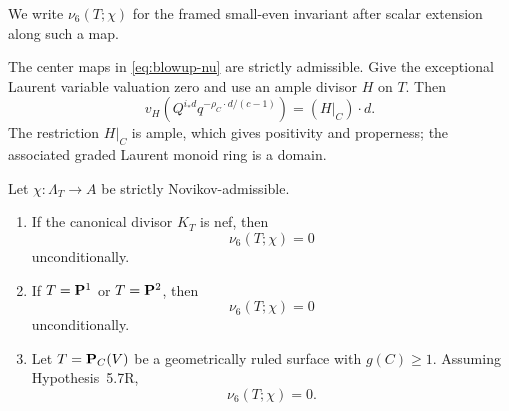 We write \(\nu_6(T;\chi)\) for the framed small-even invariant after scalar
extension along such a map.

The center maps in \eqref{eq:blowup-nu} are strictly admissible.  Give the exceptional
Laurent variable valuation zero and use an ample divisor \(H\) on \(T\).  Then
\[
 v_H\!\left(Q^{i_*d}q^{-\rho_C\cdot d/(c-1)}\right)
 =(H|_C)\cdot d.
\]
The restriction \(H|_C\) is ample, which gives positivity and properness; the
associated graded Laurent monoid ring is a domain.

\begin{proposition}
\label{prop:direct-specialized-lowdim}
%
%
Let \(\chi:\Lambda_T\to A\) be strictly Novikov-admissible.
\begin{enumerate}[label=(\roman*)]
\item If the canonical divisor \(K_T\) is nef, then
\[
  \nu_6(T;\chi)=0
\]
unconditionally.
\item If \(T=\mathbf P^1\) or \(T=\mathbf P^2\), then
\[
  \nu_6(T;\chi)=0
\]
unconditionally.
\item Let \(T=\mathbf P_C(V)\) be a geometrically ruled surface with
\(g(C)\ge1\).  Assuming Hypothesis~5.7R,
\[
  \nu_6(T;\chi)=0.
\]
\end{enumerate}
\end{proposition}


